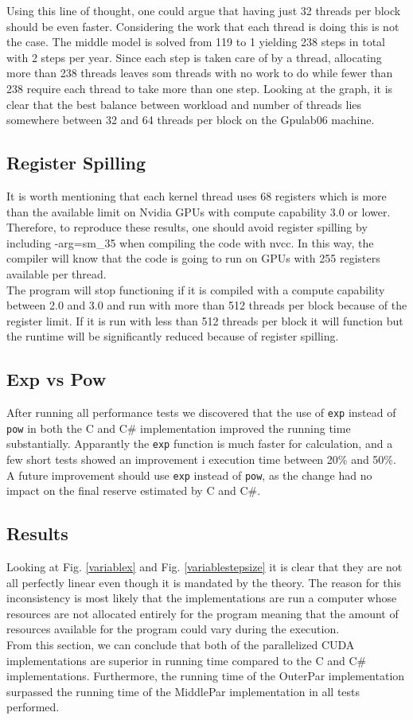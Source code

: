 Using this line of thought, one could argue that having just 32 threads per block should be even faster. Considering the work that each thread is doing this is not the case. The middle model is solved from 119 to 1 yielding 238 steps in total with 2 steps per year. Since each step is taken care of by a thread, allocating more than 238 threads leaves som threads with no work to do while fewer than 238 require each thread to take more than one step. Looking at the graph, it is clear that the best balance between workload and number of threads lies somewhere between 32 and 64 threads per block on the Gpulab06 machine.

\subsection{Register Spilling}
It is worth mentioning that each kernel thread uses 68 registers which is more than the available limit on Nvidia GPUs with compute capability 3.0 or lower. Therefore, to reproduce these results, one should avoid register spilling by including -arg=sm\_35 when compiling the code with nvcc. In this way, the compiler will know that the code is going to run on GPUs with 255 registers available per thread. \\

The program will stop functioning if it is compiled with a compute capability between 2.0 and 3.0 and run with more than 512 threads per block because of the register limit. If it is run with less than 512 threads per block it will function but the runtime will be significantly reduced because of register spilling.

\subsection{Exp vs Pow}
After running all performance tests we discovered that the use of \texttt{exp} instead of \texttt{pow} in both the C and C\# implementation improved the running time substantially. Apparantly the \texttt{exp} function is much faster for calculation, and a few short tests showed an improvement i execution time between 20\% and 50\%. A future improvement should use \texttt{exp} instead of \texttt{pow}, as the change had no impact on the final reserve estimated by C and C\#.

\subsection{Results}
Looking at Fig. \ref{variablex} and Fig. \ref{variablestepsize} it is clear that they are not all perfectly linear even though it is mandated by the theory. The reason for this inconsistency is most likely that the implementations are run a computer whose resources are not allocated entirely for the program meaning that the amount of resources available for the program could vary during the execution. \\

From this section, we can conclude that both of the parallelized CUDA implementations are superior in running time compared to the C and C\# implementations. Furthermore, the running time of the OuterPar implementation surpassed the running time of the MiddlePar implementation in all tests performed.